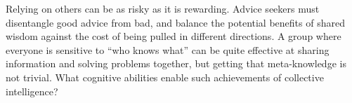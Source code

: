 \documentclass[12pt,letterpaper]{article}
\begin{document}










Relying on others can be as risky as it is rewarding. 
Advice seekers must disentangle good advice from bad, and balance the potential benefits of shared wisdom against the cost of being pulled in different directions. 
A group where everyone is sensitive to ``who knows what'' can be quite effective at sharing information and solving problems together, but getting that meta-knowledge is not trivial. 
What cognitive abilities enable such achievements of collective intelligence?

 


\end{document}
